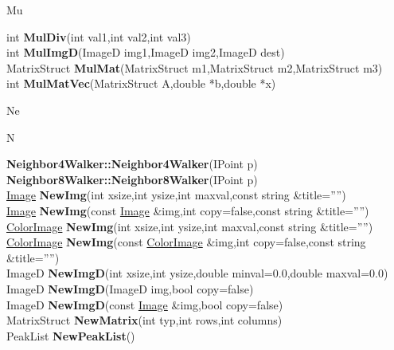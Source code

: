 \documentclass[10pt,titlepage]{article}
\def\functionlistentry#1#2#3#4#5#6{\noindent #1 {\bf #2}(#3) \dotfill #6\\}
\def\letterref#1{}
\def\letterlabel#1{\vspace{0.5cm}\centerline{\Large #1}}
\def\letterlabelend#1{}
\begin{document}
{{\letterlabel{Mu}
\letterref{A}
\letterref{B}
\letterref{C}
\letterref{D}
\letterref{E}
\letterref{F}
\letterref{G}
\letterref{H}
\letterref{I}
\letterref{K}
\letterref{L}
\letterref{M}
\letterref{N}
\letterref{O}
\letterref{P}
\letterref{Q}
\letterref{R}
\letterref{S}
\letterref{T}
\letterref{U}
\letterref{V}
\letterref{W}
\letterref{X}
\letterref{Y}
\letterref{Z}

\letterref{Ma}
\letterref{Me}
\letterref{Mi}
\letterref{Mk}
\letterref{Mo}
\letterref{Mp}
\letterref{Mu}
\letterlabelend{Mu}
\functionlistentry{int}{MulDiv}{int val1,int val2,int val3}{1356}{numeric}{}
\functionlistentry{int}{MulImgD}{ImageD img1,ImageD img2,ImageD dest}{1099}{processing}{}
\functionlistentry{MatrixStruct}{MulMat}{MatrixStruct m1,MatrixStruct m2,MatrixStruct m3}{1580}{obsolet}{}
\functionlistentry{int}{MulMatVec}{MatrixStruct A,double *b,double *x}{1581}{obsolet}{}

\letterlabel{Ne}
\letterlabel{N}
\letterref{A}
\letterref{B}
\letterref{C}
\letterref{D}
\letterref{E}
\letterref{F}
\letterref{G}
\letterref{H}
\letterref{I}
\letterref{K}
\letterref{L}
\letterref{M}
\letterref{N}
\letterref{O}
\letterref{P}
\letterref{Q}
\letterref{R}
\letterref{S}
\letterref{T}
\letterref{U}
\letterref{V}
\letterref{W}
\letterref{X}
\letterref{Y}
\letterref{Z}

\letterref{Ne}
\letterref{No}
\letterref{Nu}
\letterlabelend{Ne}
\functionlistentry{}{Neighbor4Walker::Neighbor4Walker}{IPoint p}{191}{datastructures}{}
\functionlistentry{}{Neighbor8Walker::Neighbor8Walker}{IPoint p}{192}{datastructures}{}
\functionlistentry{\hyperlink{Image}{Image}}{NewImg}{int xsize,int ysize,int maxval,const string \&title=''''}{10}{Images}{}
\functionlistentry{\hyperlink{Image}{Image}}{NewImg}{const \hyperlink{Image}{Image} \&img,int copy=false,const string \&title=''''}{11}{Images}{}
\functionlistentry{\hyperlink{ColorImage}{ColorImage}}{NewImg}{int xsize,int ysize,int maxval,const string \&title=''''}{22}{Images}{}
\functionlistentry{\hyperlink{ColorImage}{ColorImage}}{NewImg}{const \hyperlink{ColorImage}{ColorImage} \&img,int copy=false,const string \&title=''''}{23}{Images}{}
\functionlistentry{ImageD}{NewImgD}{int xsize,int ysize,double minval=0.0,double maxval=0.0}{77}{Images}{}
\functionlistentry{ImageD}{NewImgD}{ImageD img,bool copy=false}{78}{Images}{}
\functionlistentry{ImageD}{NewImgD}{const \hyperlink{Image}{Image} \&img,bool copy=false}{79}{Images}{}
\functionlistentry{MatrixStruct}{NewMatrix}{int typ,int rows,int columns}{1575}{obsolet}{}
\functionlistentry{PeakList}{NewPeakList}{}{1259}{registration}{}

}}
\end{document}
